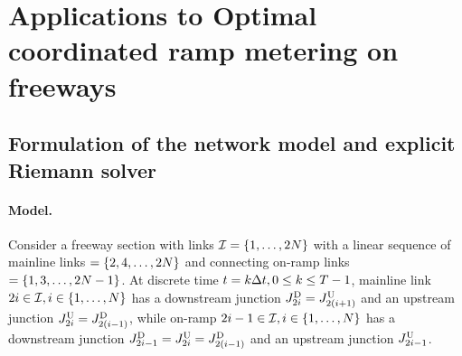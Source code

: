 \section{Applications to Optimal coordinated ramp metering on freeways\label{sec:Applications-to-Optimal}}


\subsection{Formulation of the network model and explicit Riemann solver\label{sub:Formulation-of-the}}


\paragraph{Model.}

Consider a freeway section with links $\links=\intrange 1{2\nlinks}$
with a linear sequence of mainline links $=\intrange{2,4}{2\nlinks}$
and connecting on-ramp links $=\intrange{1,3}{2\nlinks-1}$. At discrete
time $t=k\Delta t,0\le k\le T-1$, mainline link $2\link\in\links,i\in\intrange 1{\nlinks}$
has a downstream junction $\jdown{2\link}=\jup{2\left(\link+1\right)}$
and an upstream junction $\jup{2\link}=\jdown{2\left(\link-1\right)}$,
while on-ramp $2\link-1\in\links,i\in\intrange 1{\nlinks}$ has a downstream
junction $\jdown{2\link-1}=\jup{2\link}=\jdown{2\left(\link-1\right)}$
and an upstream junction $J_{2i-1}^{\text{U}}$.

